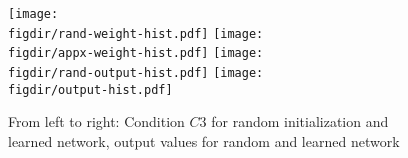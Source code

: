 \documentclass{article}
\newcommand{\figdir}{.}
\begin{document}
\begin{figure}[t]
\centering
\texttt{[image: \\figdir/rand-weight-hist.pdf]}
\texttt{[image: \\figdir/appx-weight-hist.pdf]}
\texttt{[image: \\figdir/rand-output-hist.pdf]}
\texttt{[image: \\figdir/output-hist.pdf]}
\caption{\small From left to right: Condition $C3$ for random initialization and learned network, output values for random and learned network}
\label{fig:conditions_verify4}
\end{figure}


%
\end{document}
